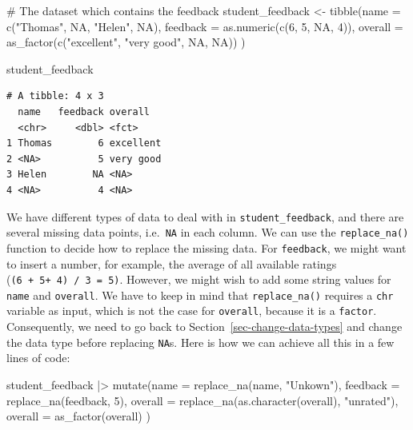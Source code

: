 \documentclass[
  letterpaper,
  DIV=11,
  numbers=noendperiod]{scrreprt}
\newenvironment{Shaded}{\begin{snugshade}}{\end{snugshade}}
\newcommand{\AttributeTok}[1]{\textcolor[rgb]{0.40,0.45,0.13}{#1}}
\newcommand{\CommentTok}[1]{\textcolor[rgb]{0.37,0.37,0.37}{#1}}
\newcommand{\ConstantTok}[1]{\textcolor[rgb]{0.56,0.35,0.01}{#1}}
\newcommand{\DecValTok}[1]{\textcolor[rgb]{0.68,0.00,0.00}{#1}}
\newcommand{\FunctionTok}[1]{\textcolor[rgb]{0.28,0.35,0.67}{#1}}
\newcommand{\NormalTok}[1]{\textcolor[rgb]{0.00,0.23,0.31}{#1}}
\newcommand{\OtherTok}[1]{\textcolor[rgb]{0.00,0.23,0.31}{#1}}
\newcommand{\SpecialCharTok}[1]{\textcolor[rgb]{0.37,0.37,0.37}{#1}}
\newcommand{\StringTok}[1]{\textcolor[rgb]{0.13,0.47,0.30}{#1}}
\begin{document}
\begin{Shaded}
\begin{Highlighting}[]
\CommentTok{\# The dataset which contains the feedback}
\NormalTok{student\_feedback }\OtherTok{\textless{}{-}} \FunctionTok{tibble}\NormalTok{(}\AttributeTok{name =} \FunctionTok{c}\NormalTok{(}\StringTok{"Thomas"}\NormalTok{, }\ConstantTok{NA}\NormalTok{, }\StringTok{"Helen"}\NormalTok{, }\ConstantTok{NA}\NormalTok{),}
                           \AttributeTok{feedback =} \FunctionTok{as.numeric}\NormalTok{(}\FunctionTok{c}\NormalTok{(}\DecValTok{6}\NormalTok{, }\DecValTok{5}\NormalTok{, }\ConstantTok{NA}\NormalTok{, }\DecValTok{4}\NormalTok{)),}
                           \AttributeTok{overall =} \FunctionTok{as\_factor}\NormalTok{(}\FunctionTok{c}\NormalTok{(}\StringTok{"excellent"}\NormalTok{,}
                                                 \StringTok{"very good"}\NormalTok{,}
                                                 \ConstantTok{NA}\NormalTok{, }\ConstantTok{NA}\NormalTok{))}
\NormalTok{                           )}

\NormalTok{student\_feedback}
\end{Highlighting}
\end{Shaded}

\begin{verbatim}
# A tibble: 4 x 3
  name   feedback overall  
  <chr>     <dbl> <fct>    
1 Thomas        6 excellent
2 <NA>          5 very good
3 Helen        NA <NA>     
4 <NA>          4 <NA>     
\end{verbatim}

We have different types of data to deal with in
\texttt{student\_feedback}, and there are several missing data points,
i.e.~\texttt{NA} in each column. We can use the \texttt{replace\_na()}
function to decide how to replace the missing data. For
\texttt{feedback}, we might want to insert a number, for example, the
average of all available ratings (\texttt{(6\ +\ 5+\ 4)\ /\ 3\ =\ 5)}.
However, we might wish to add some string values for \texttt{name} and
\texttt{overall}. We have to keep in mind that \texttt{replace\_na()}
requires a \texttt{chr} variable as input, which is not the case for
\texttt{overall}, because it is a \texttt{factor}. Consequently, we need
to go back to Section~\ref{sec-change-data-types} and change the data
type before replacing \texttt{NA}s. Here is how we can achieve all this
in a few lines of code:

\begin{Shaded}
\begin{Highlighting}[]
\NormalTok{student\_feedback }\SpecialCharTok{|\textgreater{}}
  \FunctionTok{mutate}\NormalTok{(}\AttributeTok{name =} \FunctionTok{replace\_na}\NormalTok{(name, }\StringTok{"Unkown"}\NormalTok{),}
         \AttributeTok{feedback =} \FunctionTok{replace\_na}\NormalTok{(feedback, }\DecValTok{5}\NormalTok{),}
         \AttributeTok{overall =} \FunctionTok{replace\_na}\NormalTok{(}\FunctionTok{as.character}\NormalTok{(overall),}
                              \StringTok{"unrated"}\NormalTok{),}
         \AttributeTok{overall =} \FunctionTok{as\_factor}\NormalTok{(overall)}
\NormalTok{         )}
\end{Highlighting}
\end{Shaded}
\end{document}
